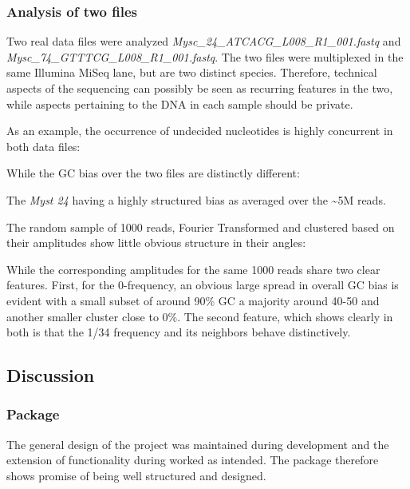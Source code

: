 \documentclass[letterpaper,10pt,english]{sphinxmanual}
\begin{document}
\subsubsection{Analysis of two files}
\label{c3se_python_course:analysis-of-two-files}
Two real data files were analyzed \emph{Mysc\_24\_ATCACG\_L008\_R1\_001.fastq} and
\emph{Mysc\_74\_GTTTCG\_L008\_R1\_001.fastq}.
The two files were multiplexed in the same Illumina MiSeq lane, but are two
distinct species.
Therefore, technical aspects of the sequencing can possibly be seen as
recurring features in the two, while aspects pertaining to the DNA in each
sample should be private.

As an example, the occurrence of undecided nucleotides is highly concurrent in
both data files:

While the GC bias over the two files are distinctly different:

The \emph{Myst 24} having a highly structured bias as averaged over the \textasciitilde{}5M reads.

The random sample of 1000 reads, Fourier Transformed and clustered based on
their amplitudes show little obvious structure in their angles:


While the corresponding amplitudes for the same 1000 reads share two clear
features. First, for the 0-frequency, an obvious large spread in overall GC
bias is evident with a small subset of around 90\% GC a majority around 40-50
and another smaller cluster close to 0\%. The second feature, which shows clearly
in both is that the 1/34 frequency and its neighbors behave distinctively.



\subsection{Discussion}
\label{c3se_python_course:discussion}

\subsubsection{Package}
\label{c3se_python_course:package}
The general design of the project was maintained during development and the
extension of functionality during worked as intended.
The package therefore shows promise of being well structured and designed.
\end{document}
